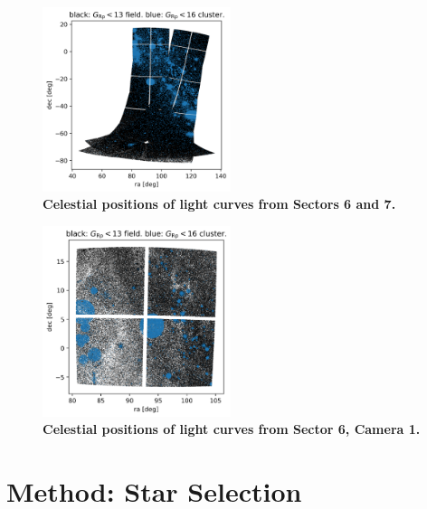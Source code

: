 \documentclass[12pt,twocolumn,tighten]{aastex62}
\begin{document}
\begin{figure}[t]
    \begin{center}
        \leavevmode
        \includegraphics[width=0.49\textwidth]{cluster_field_star_positions.png}
    \end{center}
    \vspace{-0.5cm}
    \caption{
        {\bf Celestial positions of light curves from Sectors 6 and 7.}
        \label{fig:lcradecsector6}
    }
\end{figure}

\begin{figure}[t]
	\begin{center}
		\leavevmode
		\includegraphics[width=0.49\textwidth]{cam1_cluster_field_star_positions.png}
	\end{center}
	\vspace{-0.5cm}
	\caption{
    {\bf Celestial positions of light curves from Sector 6, Camera 1.}
		\label{fig:lcradec}
	}
\end{figure}


\section{Method: Star Selection}
\label{sec:starselection}
\end{document}

